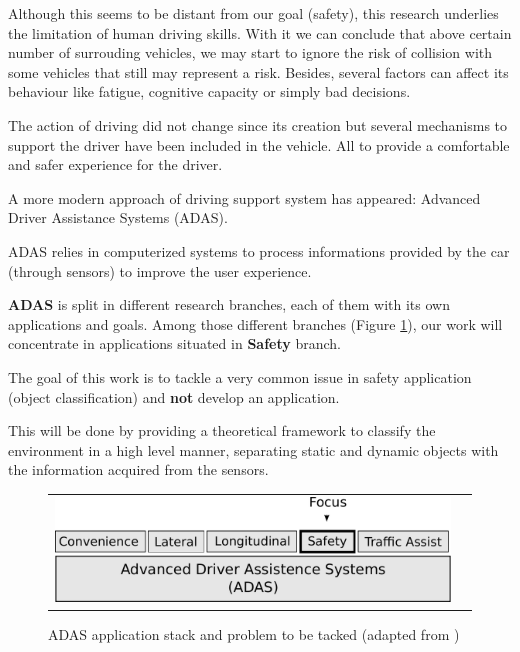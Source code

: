 Although this seems to be distant from our goal (safety), this research underlies the limitation of human driving skills. With it we can conclude that above certain number of surrouding vehicles, we may start to ignore the risk of collision with some vehicles that still may represent a risk. Besides, several factors can affect its behaviour like fatigue, cognitive capacity or simply bad decisions.


The action of driving did not change since its creation but several mechanisms to support the driver have been included in the vehicle. All to provide a comfortable and safer experience for the driver\cite{riener2010sensor}.

A more modern approach of driving support system has appeared: Advanced Driver Assistance Systems (ADAS). 

ADAS relies in computerized systems to process informations provided by the car (through sensors) to improve the user experience. 

\textbf{ADAS} is split in different research branches, each of them with its own applications and goals. Among those different branches (Figure \ref{fig:sensor:target}), our work will concentrate in applications situated in \textbf{Safety} branch. 

The goal of this work is to tackle a very common issue in safety application (object classification) and \textbf{not} develop an application.

This will be done by providing a theoretical framework to classify the environment in a high level manner, separating static and dynamic objects with the information acquired from the sensors.

\begin{figure}[h]
\centering
	\begin{tabular}{lr}\\
		\includegraphics[scale=0.7]{img/fig:sensor:target} 
	\end{tabular}
	\caption{ADAS application stack and problem to be tacked (adapted from \cite{riener2010sensor})}
	\label{fig:sensor:target}
\end{figure}

